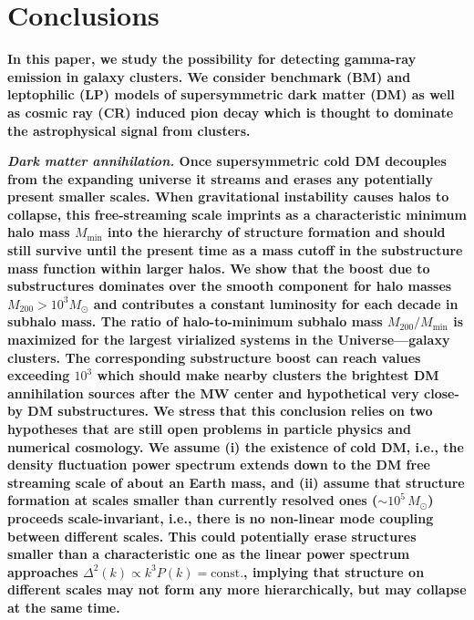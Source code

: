 \documentclass[10pt,aps,pra,reprint,amsmath,amsfonts,amssymb,showpacs,nofootinbib,floatfix]{revtex4-1}
\def\C#1{{\bf #1}}
\newcommand{\rmn}{\mathrm}
\newcommand{\msun}{M_\odot}
\newcommand{\mvir}{M_{200}}
\begin{document}
\section{Conclusions}

\C{In this paper, we study the possibility for detecting gamma-ray
  emission in galaxy clusters. We consider benchmark (BM) and
  leptophilic (LP) models of supersymmetric dark matter (DM) as well
  as cosmic ray (CR) induced pion decay which is thought to dominate
  the astrophysical signal from clusters.}

\C{{\em Dark matter annihilation.} Once supersymmetric cold DM
  decouples from the expanding universe it streams and erases any
  potentially present smaller scales. When gravitational instability
  causes halos to collapse, this free-streaming scale imprints as a
  characteristic minimum halo mass $M_\mathrm{min}$ into the hierarchy
  of structure formation and should still survive until the present
  time as a mass cutoff in the substructure mass function within
  larger halos. We show that the boost due to substructures dominates
  over the smooth component for halo masses $\mvir>10^3 \msun$ and
  contributes a constant luminosity for each decade in subhalo
  mass. The ratio of halo-to-minimum subhalo mass
  $\mvir/M_\mathrm{min}$ is maximized for the largest virialized
  systems in the Universe---galaxy clusters. The corresponding
  substructure boost can reach values exceeding $10^3$ which should
  make nearby clusters the brightest DM annihilation sources after the
  MW center and hypothetical very close-by DM substructures. We stress
  that this conclusion relies on two hypotheses that are still open
  problems in particle physics and numerical cosmology. We assume (i)
  the existence of cold DM, i.e., the density fluctuation power
  spectrum extends down to the DM free streaming scale of about an
  Earth mass, and (ii) assume that structure formation at scales
  smaller than currently resolved ones ($\sim 10^5\,\msun$) proceeds
  scale-invariant, i.e., there is no non-linear mode coupling between
  different scales. This could potentially erase structures smaller
  than a characteristic one as the linear power spectrum approaches
  $\Delta^2(k) \propto k^3 P(k)=\rmn{const.}$, implying that structure
  on different scales may not form any more hierarchically, but may
  collapse at the same time.}
\end{document}
